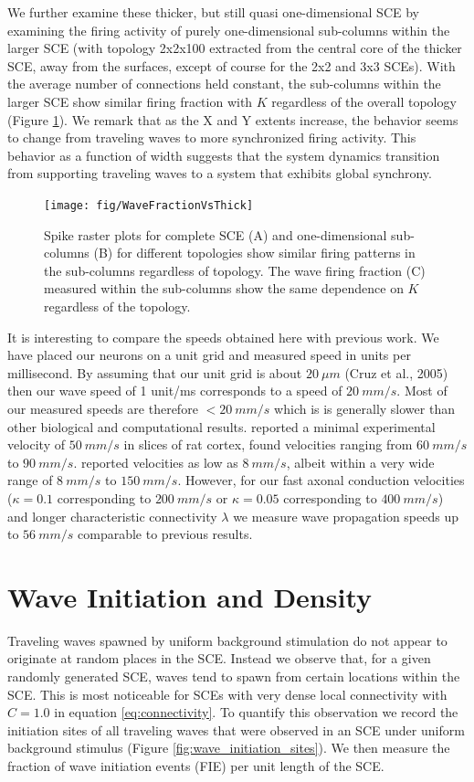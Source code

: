We further examine these thicker, but still quasi one-dimensional SCE by examining the firing activity of purely one-dimensional sub-columns within the larger SCE (with topology 2x2x100 extracted from the central core of the thicker SCE, away from the surfaces, except of course for the 2x2 and 3x3 SCEs).
With the average number of connections held constant, the sub-columns within the larger SCE show similar firing fraction with $K$ regardless of the overall topology (Figure \ref{fig:LargeSCESubcolumns}).
We remark that as the X and Y extents increase, the behavior seems to change from traveling waves to more synchronized firing activity.
This behavior as a function of width suggests that the system dynamics transition from supporting traveling waves to a system that exhibits global synchrony.
\begin{figure}[!htb]
   \texttt{[image: fig/WaveFractionVsThick]}
   \caption{ Spike raster plots for complete SCE (A) and one-dimensional sub-columns (B) for different topologies show similar firing patterns in the sub-columns regardless  of topology. 
           The wave firing fraction (C) measured within the sub-columns show the same dependence on $K$ regardless of the topology.}
   \label{fig:LargeSCESubcolumns}
\end{figure}
\FloatBarrier

It is interesting to compare the speeds obtained here with previous work.
We have placed our neurons on a unit grid and measured speed in units per millisecond.
By assuming that our unit grid is about $20~\mu m$ (Cruz et al., 2005) then our wave speed of 1 unit/ms corresponds to a speed of $20~mm/s$. 
Most of our measured speeds are therefore $<20~mm/s$ which is is generally slower than other biological and computational results.
\citet{Golomb1997} reported a minimal experimental velocity of $50~mm/s$ in slices of rat cortex, \citet{Chervin1988} found velocities ranging from $60~mm/s$ to $90~mm/s$.
\citet{Wadman1993} reported velocities as low as $8~mm/s$, albeit within a very wide range of $8~mm/s$ to $150~mm/s$.
However, for our fast axonal conduction velocities ($\kappa=0.1$ corresponding to $200~mm/s$ or $\kappa=0.05$ corresponding to $400~mm/s$) 
and longer characteristic connectivity $\lambda$ we measure wave propagation speeds up to $56~mm/s$ comparable to previous results.


\FloatBarrier

\section{Wave Initiation and Density} \label{sub:wave_initiation}
Traveling waves spawned by uniform background stimulation do not appear to originate at random places in the SCE.
Instead we observe that, for a given randomly generated SCE, waves tend to spawn from certain locations within the SCE.
This is most noticeable for SCEs with very dense local connectivity with $C=1.0$ in equation \ref{eq:connectivity}.
To quantify this observation we record the initiation sites of all traveling waves that were observed in an SCE under uniform background stimulus (Figure \ref{fig:wave_initiation_sites}).
We then measure the fraction of wave initiation events (FIE) per unit length of the SCE.

